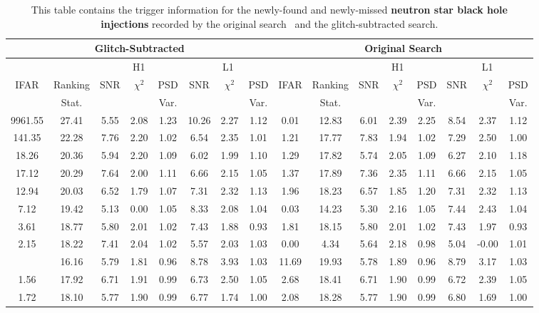 \newpage

\begin{landscape}
\begin{table}[tb]
\centering
\caption{\label{tab:apdx_changed_snr_nsbh}This table contains the trigger information for the newly-found and newly-missed \textbf{neutron star black hole injections} recorded by the original search~\cite{gwtc3} and the glitch-subtracted search.} 
\begin{tabular}{|c|c|c|c|c|c|c|c||c|c|c|c|c|c|c|c|}
\hline
\multicolumn{8}{|c||}{Glitch-Subtracted} & \multicolumn{8}{c|}{Original Search} \\
\hline
\multicolumn{2}{|c|}{} & \multicolumn{3}{c|}{H1} & \multicolumn{3}{c||}{L1} & \multicolumn{2}{c|}{} & \multicolumn{3}{c|}{H1} & \multicolumn{3}{c|}{L1}\\
\hline
IFAR & Ranking & SNR & $\chi^{2}$ & PSD & SNR & $\chi^{2}$ & PSD & IFAR & Ranking & SNR & $\chi^{2}$ & PSD & SNR & $\chi^{2}$ & PSD \\ &
Stat. & & & Var. & & & Var. & & Stat. & & & Var. & & & Var.\\
\hline
9961.55 & 27.41 & 5.55 & 2.08 & 1.23 & 10.26 & 2.27 & 1.12 & 0.01 & 12.83 & 6.01 & 2.39 & 2.25 & 8.54 & 2.37 & 1.12 \\
141.35 & 22.28 & 7.76 & 2.20 & 1.02 & 6.54 & 2.35 & 1.01 & 1.21 & 17.77 & 7.83 & 1.94 & 1.02 & 7.29 & 2.50 & 1.00 \\
18.26 & 20.36 & 5.94 & 2.20 & 1.09 & 6.02 & 1.99 & 1.10 & 1.29 & 17.82 & 5.74 & 2.05 & 1.09 & 6.27 & 2.10 & 1.18 \\
17.12 & 20.29 & 7.64 & 2.00 & 1.11 & 6.66 & 2.15 & 1.05 & 1.37 & 17.89 & 7.36 & 2.35 & 1.11 & 6.66 & 2.15 & 1.05 \\
12.94 & 20.03 & 6.52 & 1.79 & 1.07 & 7.31 & 2.32 & 1.13 & 1.96 & 18.23 & 6.57 & 1.85 & 1.20 & 7.31 & 2.32 & 1.13 \\
7.12 & 19.42 & 5.13 & 0.00 & 1.05 & 8.33 & 2.08 & 1.04 & 0.03 & 14.23 & 5.30 & 2.16 & 1.05 & 7.44 & 2.43 & 1.04 \\
3.61 & 18.77 & 5.80 & 2.01 & 1.02 & 7.43 & 1.88 & 0.93 & 1.81 & 18.15 & 5.80 & 2.01 & 1.02 & 7.43 & 1.97 & 0.93 \\
2.15 & 18.22 & 7.41 & 2.04 & 1.02 & 5.57 & 2.03 & 1.03 & 0.00 & 4.34 & 5.64 & 2.18 & 0.98 & 5.04 & -0.00 & 1.01 \\
\hdashline
0.23 & 16.16 & 5.79 & 1.81 & 0.96 & 8.78 & 3.93 & 1.03 & 11.69 & 19.93 & 5.78 & 1.89 & 0.96 & 8.79 & 3.17 & 1.03 \\
1.56 & 17.92 & 6.71 & 1.91 & 0.99 & 6.73 & 2.50 & 1.05 & 2.68 & 18.41 & 6.71 & 1.90 & 0.99 & 6.72 & 2.39 & 1.05 \\
1.72 & 18.10 & 5.77 & 1.90 & 0.99 & 6.77 & 1.74 & 1.00 & 2.08 & 18.28 & 5.77 & 1.90 & 0.99 & 6.80 & 1.69 & 1.00 \\
\hline
\end{tabular}
\end{table}
\end{landscape}
\restoregeometry %

